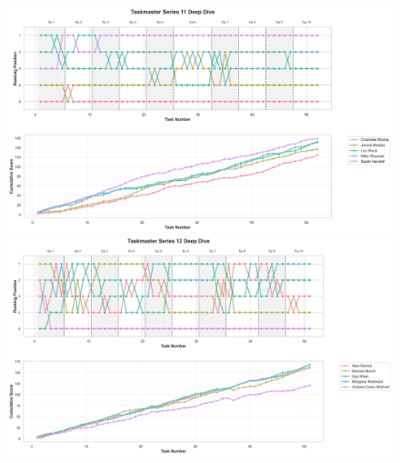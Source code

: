 \documentclass[10pt,letterpaper]{article}
\begin{document}
\begin{figure}[!h]
\centering
\includegraphics[width=\linewidth]{supfigure/series_11_deep_dive.png}
\includegraphics[width=\linewidth]{supfigure/series_12_deep_dive.png}
\end{figure}
\FloatBarrier
\clearpage
\end{document}
